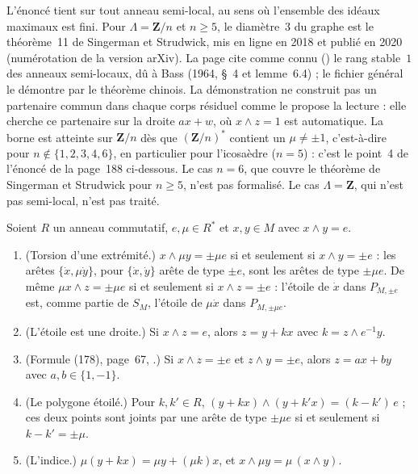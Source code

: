 \begin{remarque}
L'énoncé tient sur tout anneau semi-local, au sens où l'ensemble des idéaux maximaux est fini. Pour $\Lambda = \mathbf Z/n$ et $n \geq 5$, le diamètre~$3$ du graphe est le théorème~11 de Singerman et Strudwick, mis en ligne en 2018 et publié en 2020 \cite{singermanstrudwick2020} (numérotation de la version arXiv). La page cite comme connu () le rang stable~$1$ des anneaux semi-locaux, dû à Bass (1964, §~4 et lemme~6.4) \cite{bass1964} ; le fichier général le démontre par le théorème chinois. La démonstration ne construit pas un partenaire commun dans chaque corps résiduel comme le propose la lecture : elle cherche ce partenaire sur la droite $ax + w$, où $x \wedge z = 1$ est automatique. La borne est atteinte sur $\mathbf Z/n$ dès que $(\mathbf Z/n)^*$ contient un $\mu \neq \pm 1$, c'est-à-dire pour $n \notin \{1, 2, 3, 4, 6\}$, en particulier pour l'icosaèdre ($n = 5$) : c'est le point~4 de l'énoncé de la page~188 ci-dessous. Le cas $n = 6$, que couvre le théorème de Singerman et Strudwick pour $n \geq 5$, n'est pas formalisé. Le cas $\Lambda = \mathbf Z$, qui n'est pas semi-local, n'est pas traité.
\end{remarque}

\begin{enonce}
Soient $R$ un anneau commutatif, $e, \mu \in R^*$ et $x, y \in M$ avec $x \wedge y = e$.
\begin{enumerate}
\item (Torsion d'une extrémité.) $x \wedge \mu y = \pm \mu e$ si et seulement si $x \wedge y = \pm e$ : les arêtes $\{\dot x, \mu\dot y\}$, pour $\{\dot x, \dot y\}$ arête de type $\pm e$, sont les arêtes de type $\pm\mu e$. De même $\mu x \wedge z = \pm\mu e$ si et seulement si $x \wedge z = \pm e$ : l'étoile de $\dot x$ dans $P_{M, \pm e}$ est, comme partie de $S_M$, l'étoile de $\mu\dot x$ dans $P_{M, \pm\mu e}$.
\item (L'étoile est une droite.) Si $x \wedge z = e$, alors $z = y + kx$ avec $k = z \wedge e^{-1}y$.
\item (Formule (178), page~67, .) Si $x \wedge z = \pm e$ et $z \wedge y = \pm e$, alors $z = ax + by$ avec $a, b \in \{1, -1\}$.
\item (Le polygone étoilé.) Pour $k, k' \in R$, $(y + kx) \wedge (y + k'x) = (k - k')\,e$ ; ces deux points sont joints par une arête de type $\pm\mu e$ si et seulement si $k - k' = \pm\mu$.
\item (L'indice.) $\mu(y + kx) = \mu y + (\mu k)x$, et $x \wedge \mu y = \mu\,(x \wedge y)$.
\end{enumerate}
\end{enonce}

